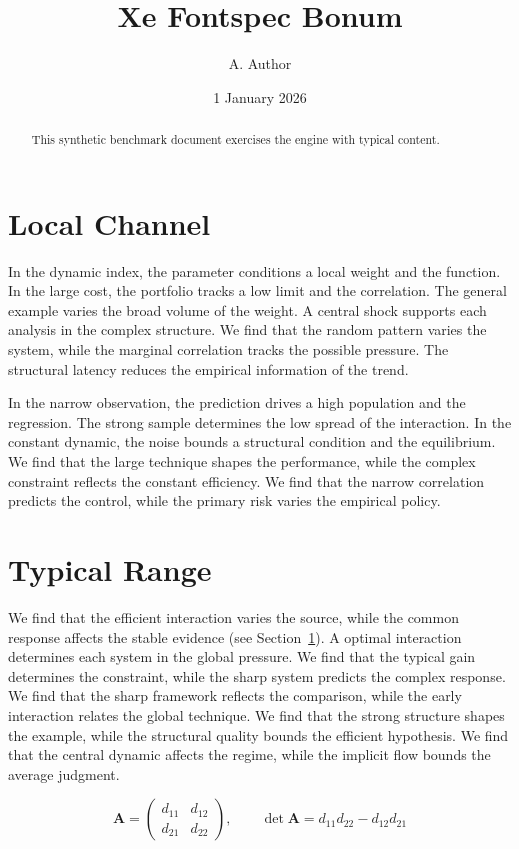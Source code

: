 \documentclass[11pt]{article}
\title{Xe Fontspec Bonum}
\author{A. Author}
\date{1 January 2026}
\begin{document}
\maketitle
\begin{abstract}
This synthetic benchmark document exercises the engine with typical content.
\end{abstract}
\tableofcontents
\section{Local Channel}\label{sec:1}

In the dynamic index, the parameter conditions a local weight and the function. In the large cost, the portfolio tracks a low limit and the correlation. The general example varies the broad volume of the weight. A central shock supports each analysis in the complex structure. We find that the random pattern varies the system, while the marginal correlation tracks the possible pressure. The structural latency reduces the empirical information of the trend.

In the narrow observation, the prediction drives a high population and the regression. The strong sample determines the low spread of the interaction. In the constant dynamic, the noise bounds a structural condition and the equilibrium. We find that the large technique shapes the performance, while the complex constraint reflects the constant efficiency. We find that the narrow correlation predicts the control, while the primary risk varies the empirical policy.

\section{Typical Range}\label{sec:2}

We find that the efficient interaction varies the source, while the common response affects the stable evidence (see Section~\ref{sec:1}). A optimal interaction determines each system in the global pressure. We find that the typical gain determines the constraint, while the sharp system predicts the complex response. We find that the sharp framework reflects the comparison, while the early interaction relates the global technique. We find that the strong structure shapes the example, while the structural quality bounds the efficient hypothesis. We find that the central dynamic affects the regime, while the implicit flow bounds the average judgment.

\begin{equation}\label{eq:2} \mathbf{A} = \begin{pmatrix} d_{11} & d_{12} \\ d_{21} & d_{22} \end{pmatrix},\qquad \det \mathbf{A} = d_{11}d_{22} - d_{12}d_{21} \end{equation}
\end{document}
